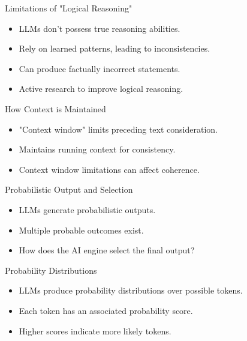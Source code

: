 \begin{frame}{Limitations of "Logical Reasoning"}
  \begin{itemize}
    \item LLMs don't possess true reasoning abilities.
    \item Rely on learned patterns, leading to inconsistencies.
    \item Can produce factually incorrect statements.
    \item Active research to improve logical reasoning.
  \end{itemize}
\end{frame}

\begin{frame}{How Context is Maintained}
  \begin{itemize}
    \item "Context window" limits preceding text consideration.
    \item Maintains running context for consistency.
    \item Context window limitations can affect coherence.
  \end{itemize}
\end{frame}

\begin{frame}{Probabilistic Output and Selection}
  \begin{itemize}
    \item LLMs generate probabilistic outputs.
    \item Multiple probable outcomes exist.
    \item How does the AI engine select the final output?
  \end{itemize}
\end{frame}

\begin{frame}{Probability Distributions}
  \begin{itemize}
    \item LLMs produce probability distributions over possible tokens.
    \item Each token has an associated probability score.
    \item Higher scores indicate more likely tokens.
  \end{itemize}
\end{frame}

